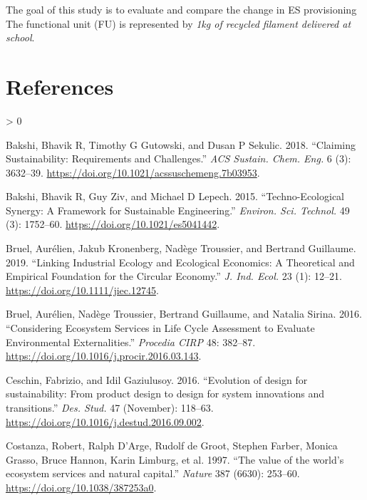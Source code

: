 \documentclass[
]{article}
\newlength{\cslhangindent}
\newenvironment{CSLReferences}[2] %
 {%
  \setlength{\parindent}{0pt}
  \ifodd #1 \everypar{\setlength{\hangindent}{\cslhangindent}}\ignorespaces\fi
  \ifnum #2 > 0
  \setlength{\parskip}{#2\baselineskip}
  \fi
 }%
 {}
\begin{document}
The goal of this study is to evaluate and compare the change in ES provisioning
The functional unit (FU) is represented by \emph{1kg of recycled filament delivered at school}.

\newpage

\hypertarget{references}{%
\section*{References}\label{references}}

\hypertarget{refs}{}
\begin{CSLReferences}{1}{0}
\leavevmode\hypertarget{ref-Bakshi2018}{}%
Bakshi, Bhavik R, Timothy G Gutowski, and Dusan P Sekulic. 2018. {``{Claiming Sustainability: Requirements and Challenges}.''} \emph{ACS Sustain. Chem. Eng.} 6 (3): 3632--39. \url{https://doi.org/10.1021/acssuschemeng.7b03953}.

\leavevmode\hypertarget{ref-Bakshi2015}{}%
Bakshi, Bhavik R, Guy Ziv, and Michael D Lepech. 2015. {``{Techno-Ecological Synergy: A Framework for Sustainable Engineering}.''} \emph{Environ. Sci. Technol.} 49 (3): 1752--60. \url{https://doi.org/10.1021/es5041442}.

\leavevmode\hypertarget{ref-Bruel2018}{}%
Bruel, Aurélien, Jakub Kronenberg, Nadège Troussier, and Bertrand Guillaume. 2019. {``{Linking Industrial Ecology and Ecological Economics: A Theoretical and Empirical Foundation for the Circular Economy}.''} \emph{J. Ind. Ecol.} 23 (1): 12--21. \url{https://doi.org/10.1111/jiec.12745}.

\leavevmode\hypertarget{ref-Bruel2016}{}%
Bruel, Aurélien, Nadège Troussier, Bertrand Guillaume, and Natalia Sirina. 2016. {``{Considering Ecosystem Services in Life Cycle Assessment to Evaluate Environmental Externalities}.''} \emph{Procedia CIRP} 48: 382--87. \url{https://doi.org/10.1016/j.procir.2016.03.143}.

\leavevmode\hypertarget{ref-Ceschin2016}{}%
Ceschin, Fabrizio, and Idil Gaziulusoy. 2016. {``{Evolution of design for sustainability: From product design to design for system innovations and transitions}.''} \emph{Des. Stud.} 47 (November): 118--63. \url{https://doi.org/10.1016/j.destud.2016.09.002}.

\leavevmode\hypertarget{ref-Costanza1997}{}%
Costanza, Robert, Ralph D'Arge, Rudolf de Groot, Stephen Farber, Monica Grasso, Bruce Hannon, Karin Limburg, et al. 1997. {``{The value of the world's ecosystem services and natural capital}.''} \emph{Nature} 387 (6630): 253--60. \url{https://doi.org/10.1038/387253a0}.


\end{CSLReferences}
\end{document}
